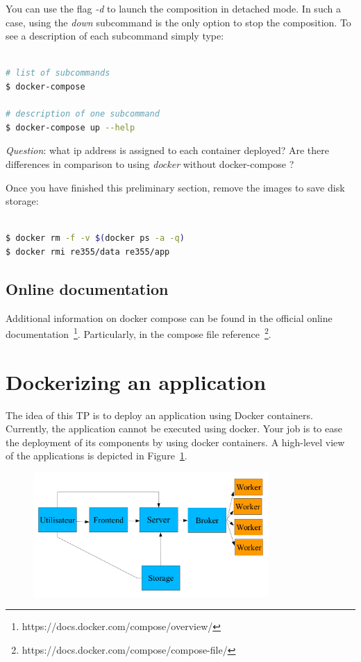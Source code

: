 \documentclass[a4paper,11pt]{exam}
\begin{document}
You can use the flag \textit{-d} to launch the composition in detached mode. In such a case, using the \textit{down} subcommand is the only option to stop the composition. 
To see a description of each subcommand simply type:
\begin{lstlisting}[frame=single,language={sh}] % Start your code-block

# list of subcommands
$ docker-compose

# description of one subcommand
$ docker-compose up --help
\end{lstlisting}

\textit{Question}: what ip address is assigned to each container deployed? Are there differences in comparison to using \textit{docker} without docker-compose ?

Once you have finished this preliminary section, remove the images to save disk storage:
\begin{lstlisting}[frame=single,language={sh}] % Start your code-block

$ docker rm -f -v $(docker ps -a -q)
$ docker rmi re355/data re355/app
\end{lstlisting}

\subsection{Online documentation}
Additional information on docker compose can be found in the official online documentation~\footnote{https://docs.docker.com/compose/overview/}. Particularly,  in the compose file reference~\footnote{https://docs.docker.com/compose/compose-file/}.

\section{Dockerizing an application}

The idea of this TP is to deploy an application using Docker containers.
Currently, the application cannot be executed using docker. Your job is to ease the deployment of its components by using docker containers.
A high-level view of the applications is depicted in Figure~\ref{fig:architecture}.

\begin{figure}[!ht]
	\centering
	\includegraphics[width=0.8\textwidth]{fig/architecture.png}
	\label{fig:architecture}
\end{figure}
\end{document}
